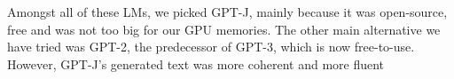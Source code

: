 Amongst all of these LMs, we picked GPT-J, mainly because it was open-source, free and was not too big for our GPU memories. The other main alternative we have tried was GPT-2\cite{radford2019language}, the predecessor of GPT-3, which is now free-to-use. However, GPT-J's generated text was more coherent and more fluent \\



